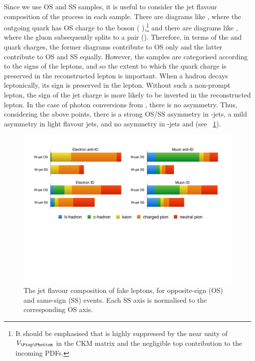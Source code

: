Since we use OS and SS samples, it is useful to consider the jet flavour composition of 
the \Wjets process in each sample. There are diagrams like , where the outgoing quark has OS charge to the \PW boson (\eg 
\HepProcess{\PW + \Pcharm}),\footnote{
	It should be emphasised that \HepProcess{\Pquark\Pgluon \HepTo \PW+\Pbottom} is highly 
	suppressed by the near unity of $V_{\Ptop\Pbottom}$	in the CKM matrix and the negligible
	top contribution to the incoming PDFs.
} 
and there are diagrams like , where the gluon subsequently splits to a \HepProcess{\Pquark\APquark} 
pair (\eg \HepProcess{\PW + \Pbottom\APbottom}). Therefore, in terms of the \PW and quark 
charges, the former diagrams contribute to OS only and the latter contribute to OS and 
SS equally. However, the samples are categorised according to the signs of the leptons, 
and so the extent to which the quark charge is preserved in the reconstructed lepton is 
important. When a hadron decays leptonically, its sign is preserved in the lepton. 
Without such a non-prompt lepton, the sign of the jet charge is more likely to be inverted 
in the reconstructed lepton. In the case of photon conversions from \HepProcess{\Ppizero 
\HepTo \Pphoton\Pphoton}, there is no asymmetry. Thus, considering the above points, there 
is a strong OS/SS asymmetry in \Pcharm-jets, a mild asymmetry in light flavour jets, and no 
asymmetry in \Pbottom-jets and \HepProcess{\Ppizero \HepTo \Pphoton\Pphoton} (see 
\Figure~\ref{fig:wjets:flav_comp}).

\begin{figure}[t]
	\includegraphics[width=\textwidth,clip=true,trim=1.8cm 12cm 2cm 2cm]{custom_images/wjets/wjets_flavcomp}
	\caption{The jet flavour composition of fake leptons, for opposite-sign (OS) and 
	same-sign (SS) \Wjets events. Each SS axis is normalised to the corresponding OS 
	axis.}
	\label{fig:wjets:flav_comp}
\end{figure}

